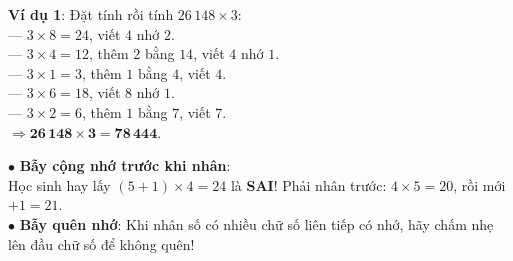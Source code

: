 \documentclass[14pt,a4paper,oneside]{extbook}
\begin{document}
\noindent
\begin{minipage}[t]{0.53\textwidth}
  \begin{tcolorbox}[
    enhanced,
    title={\footnotesize\bfseries\color{white}\faCheckCircle\ Ví dụ thực hành chuẩn mực},
    colback=green!2!white,
    colframe=green!60!black,
    arc=2.5mm, boxrule=0.8pt, top=1.8mm, bottom=1.8mm, left=2.2mm, right=2.2mm
  ]
    \footnotesize
    \textbf{Ví dụ 1}: Đặt tính rồi tính $26\,148 \times 3$:\\
    --- $3 \times 8 = 24$, viết $4$ nhớ $2$.\\
    --- $3 \times 4 = 12$, thêm $2$ bằng $14$, viết $4$ nhớ $1$.\\
    --- $3 \times 1 = 3$, thêm $1$ bằng $4$, viết $4$.\\
    --- $3 \times 6 = 18$, viết $8$ nhớ $1$.\\
    --- $3 \times 2 = 6$, thêm $1$ bằng $7$, viết $7$.\\
    $\Rightarrow \mathbf{26\,148 \times 3 = 78\,444}$.
  \end{tcolorbox}
\end{minipage}%
\hfill
\begin{minipage}[t]{0.45\textwidth}
  \begin{tcolorbox}[
    enhanced,
    title={\footnotesize\bfseries\color{white}\faExclamationTriangle\ Mẹo tránh bẫy trắc nghiệm},
    colback=red!2!white,
    colframe=red!70!black,
    arc=2.5mm, boxrule=0.8pt, top=1.8mm, bottom=1.8mm, left=2.2mm, right=2.2mm
  ]
    \footnotesize
    $\bullet$ \textbf{Bẫy cộng nhớ trước khi nhân}:\\
    Học sinh hay lấy $(5 + 1) \times 4 = 24$ là \textbf{SAI}! Phải nhân trước: $4 \times 5 = 20$, rồi mới $+ 1 = 21$.\\
    $\bullet$ \textbf{Bẫy quên nhớ}: Khi nhân số có nhiều chữ số liên tiếp có nhớ, hãy chấm nhẹ lên đầu chữ số để không quên!
  \end{tcolorbox}
\end{minipage}
\end{document}
